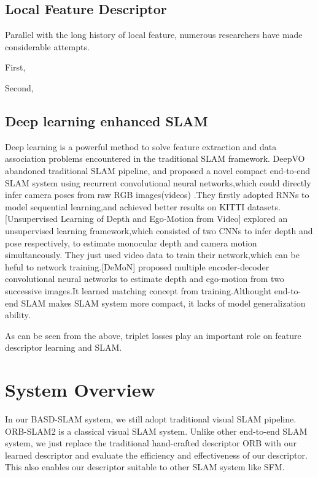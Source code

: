 \documentclass[letterpaper, 10 pt, conference]{ieeeconf}  %
\begin{document}
\subsection{Local Feature Descriptor}
Parallel with the long history of local feature, numerous researchers have made considerable attempts. 

First, 

Second, 

\subsection{Deep learning enhanced SLAM}
Deep learning is a powerful method to solve feature extraction and data association problems encountered in the traditional SLAM framework. 
DeepVO abandoned traditional SLAM pipeline, and proposed a novel compact end-to-end SLAM system using recurrent convolutional neural networks,which could directly infer camera poses from raw RGB images(videos) .They firstly adopted RNNs to model sequential learning,and achieved better results on KITTI datasets. [Unsupervised Learning of Depth and Ego-Motion from Video] explored an unsupervised learning framework,which consisted of two CNNs to infer depth and pose respectively, to estimate monocular depth and camera motion simultaneously. They just used video data to train their network,which can be heful to network training.[DeMoN] proposed multiple encoder-decoder convolutional neural networks to estimate depth and ego-motion from two successive images.It learned matching concept from training.Althought end-to-end SLAM makes SLAM system more compact, it lacks of model generalization ability.

As can be seen from the above, triplet losses play an important role on feature descriptor learning and SLAM. 



\section{System Overview}
In our BASD-SLAM system, we still adopt traditional visual SLAM pipeline. ORB-SLAM2 is a classical visual SLAM system. Unlike other end-to-end SLAM system, we just replace the traditional hand-crafted descriptor ORB with our learned descriptor and evaluate the efficiency and effectiveness of our descriptor. This also enables our descriptor suitable to other SLAM system like SFM.
\end{document}
